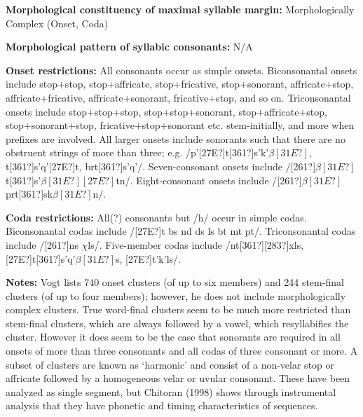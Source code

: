 \begin{styleBody}
\textbf{Morphological constituency of maximal syllable margin:} Morphologically Complex (Onset, Coda)
\end{styleBody}

\begin{styleBody}
\textbf{Morphological pattern of syllabic consonants:} N/A
\end{styleBody}

\begin{styleBody}
\textbf{Onset restrictions: }All consonants occur as simple onsets. Biconsonantal onsets include stop+stop, stop+affricate, stop+fricative, stop+sonorant, affricate+stop, affricate+fricative, affricate+sonorant, fricative+stop, and so on. Triconsonantal onsets include stop+stop+stop, stop+stop+sonorant, stop+affricate+stop, stop+sonorant+stop, fricative+stop+sonorant etc. stem-initially, and more when prefixes are involved. All larger onsets include sonorants such that there are no obstruent strings of more than three; e.g. /p’[27E?]t[361?]s’k'$\beta [31E?]$, t[361?]s’q’[27E?]t, brt[361?]s'q{}'/. Seven-consonant onsets include /[261?]$\beta [31E?]$t[361?]s’$\beta [31E?][27E?]$tn/. Eight-consonant onsets include /[261?]$\beta [31E?]$prt[361?]sk$\beta [31E?]$n/.
\end{styleBody}

\begin{styleBody}
\textbf{Coda restrictions: }All(?) consonants but /h/ occur in simple codas. Biconsonantal codas include /[27E?]t bs nd ds ls bt mt pt/. Triconsonantal codas include /[261?]ns $\chi $ls/. Five-member codas include /nt[361?][283?]xls, [27E?]t[361?]s’q’$\beta [31E?]$s, [27E?]t'k'ls/.
\end{styleBody}

\begin{styleBody}
\textbf{Notes: }Vogt lists 740 onset clusters (of up to six members) and 244 stem-final clusters (of up to four members); however, he does not include morphologically complex clusters. True word-final clusters seem to be much more restricted than stem-final clusters, which are always followed by a vowel, which resyllabifies the cluster. However it does seem to be the case that sonorants are required in all onsets of more than three consonants and all codas of three consonant or more. A subset of clusters are known as ‘harmonic’ and consist of a non-velar stop or affricate followed by a homogeneous velar or uvular consonant. These have been analyzed as single segment, but Chitoran (1998) shows through instrumental analysis that they have phonetic and timing characteristics of sequences.
\end{styleBody}

